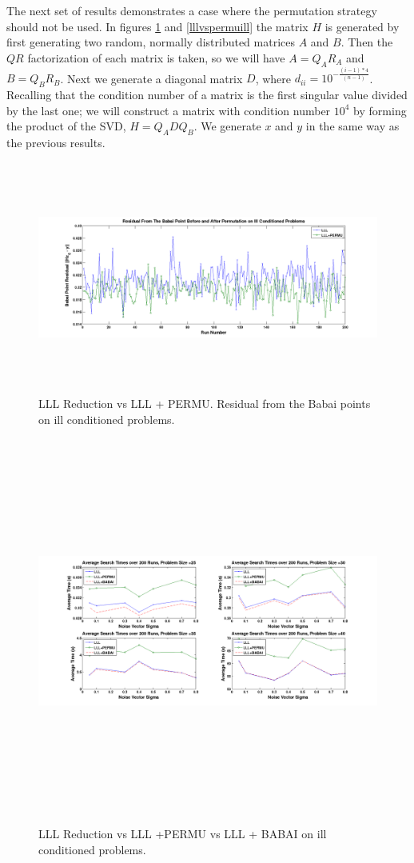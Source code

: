 \documentclass[12pt,Bold,letterpaper]{mcgilletdclass}
\begin{document}
The next set of results demonstrates a case where the permutation strategy should not be used. In figures \ref{fig:lllvspermubabaiill} and \ref{lllvspermuill} the matrix $H$ is generated by first generating two random, normally distributed matrices $A$ and $B$. Then the $QR$ factorization of each matrix is taken, so we will have $A = Q_AR_A$ and $B = Q_BR_B$. Next we generate a diagonal matrix $D$, where $d_{ii} = 10^{-\frac{(i-1)*4}{(n-1)}}$. Recalling that the condition number of a matrix is the first singular value divided by the last one; we will construct a  matrix with condition number $10^4$ by forming the product of the SVD, $H = Q_ADQ_B$. We generate $x$ and $y$ in the same way as the previous results.

\begin{figure}
\centering
\includegraphics[width=6in,height=3in]{lllvspermubabaiill.png}
\caption{LLL Reduction vs LLL + PERMU. Residual from the Babai points on ill conditioned problems.}
\label{fig:lllvspermubabaiill}
\end{figure}

\begin{figure}
\centering
\includegraphics[width=6.5in,height=5in]{lllvspermuvsbabaiill.png}
\caption{LLL Reduction vs LLL +PERMU vs LLL + BABAI on ill conditioned problems.}
\label{fig:lllvspermuvsbabaiill}
\end{figure}
\end{document}
